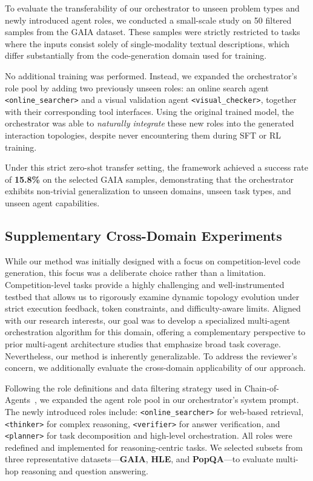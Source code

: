 \documentclass{article}
\theoremstyle{definition}
\begin{document}
To evaluate the transferability of our orchestrator to unseen problem types and newly introduced agent roles, we conducted a small-scale study on 50 filtered samples from the GAIA \citep{mialon2023gaia} dataset. These samples were strictly restricted to tasks where the inputs consist solely of single-modality textual descriptions, which differ substantially from the code-generation domain used for training.

No additional training was performed. Instead, we expanded the orchestrator’s role pool by adding two previously unseen roles: an online search agent \texttt{<online\_searcher>} and a visual validation agent \texttt{<visual\_checker>}, together with their corresponding tool interfaces. Using the original trained model, the orchestrator was able to \emph{naturally integrate} these new roles into the generated interaction topologies, despite never encountering them during SFT or RL training.

Under this strict zero-shot transfer setting, the framework achieved a success rate of \textbf{15.8\%} on the selected GAIA samples, demonstrating that the orchestrator exhibits non-trivial generalization to unseen domains, unseen task types, and unseen agent capabilities.
\subsection{Supplementary Cross-Domain Experiments}
\label{appendix:cross_domain}
While our method was initially designed with a focus on competition-level code generation, this focus was a deliberate choice rather than a limitation. Competition-level tasks provide a highly challenging and well-instrumented testbed that allows us to rigorously examine dynamic topology evolution under strict execution feedback, token constraints, and difficulty-aware limits. Aligned with our research interests, our goal was to develop a specialized multi-agent orchestration algorithm for this domain, offering a complementary perspective to prior multi-agent architecture studies that emphasize broad task coverage. Nevertheless, our method is inherently generalizable. To address the reviewer's concern, we additionally evaluate the cross-domain applicability of our approach.

Following the role definitions and data filtering strategy used in Chain-of-Agents~\cite{chainofagents}, we expanded the agent role pool in our orchestrator’s system prompt. The newly introduced roles include: 
\texttt{<online\_searcher>} for web-based retrieval,
\texttt{<thinker>} for complex reasoning,
\texttt{<verifier>} for answer verification, and
\texttt{<planner>} for task decomposition and high-level orchestration.
All roles were redefined and implemented for reasoning-centric tasks. We selected subsets from three representative datasets---\textbf{GAIA\citep{mialon2023gaia}}, \textbf{HLE\citep{phan2025humanity}}, and \textbf{PopQA\citep{mallen2023not}}---to evaluate multi-hop reasoning and question answering.
\end{document}
